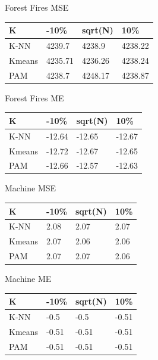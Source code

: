 \documentclass[twoside,11pt]{article}
\begin{document}
\begin{table}[h]
\begin{minipage}[b]{0.45\linewidth}
\begin{tabular}{llll}
		\end{tabular}
	\end{minipage}
	\begin{minipage}[b]{0.45\linewidth}\centering
		Forest Fires MSE
		\begin{tabular}{llll}
			\hline
			K      & -10\%   & sqrt(N) & 10\%    \\ \hline
			K-NN   & 4239.7  & 4238.9  & 4238.22 \\
			Kmeans & 4235.71 & 4236.26 & 4238.24 \\
			PAM    & 4238.7  & 4248.17 & 4238.87
		\end{tabular}
	\end{minipage}
	\hspace{0.5cm}\centering
	\begin{minipage}[b]{0.45\linewidth}
		Forest Fires ME
		\centering
		\begin{tabular}{llll}
			\hline
			K      & -10\%  & sqrt(N) & 10\%   \\ \hline
			K-NN   & -12.64 & -12.65  & -12.67 \\
			Kmeans & -12.72 & -12.67  & -12.65 \\
			PAM    & -12.66 & -12.57  & -12.63
		\end{tabular}
	\end{minipage}
	\begin{minipage}[b]{0.45\linewidth}\centering
		Machine MSE
		\begin{tabular}{llll}
			\hline
			K      & -10\% & sqrt(N) & 10\% \\ \hline
			K-NN   & 2.08  & 2.07    & 2.07 \\
			Kmeans & 2.07  & 2.06    & 2.06 \\
			PAM    & 2.07  & 2.07    & 2.06
		\end{tabular}
	\end{minipage}
	\hspace{0.5cm}\centering
	\begin{minipage}[b]{0.45\linewidth}
		Machine ME
		\centering
		\begin{tabular}{llll}
			\hline
			K      & -10\% & sqrt(N) & 10\%  \\ \hline
			K-NN   & -0.5  & -0.5    & -0.51 \\
			Kmeans & -0.51 & -0.51   & -0.51 \\
			PAM    & -0.51 & -0.51   & -0.51
		\end{tabular}
	\end{minipage}

\end{table}
\end{document}
